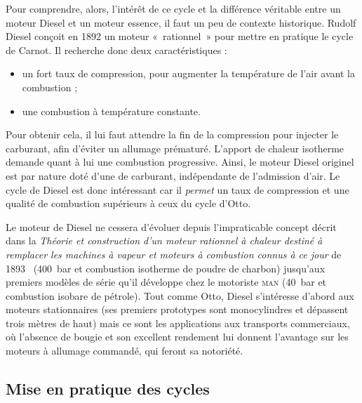 		Pour comprendre, alors, l’intérêt de ce cycle et la différence véritable entre un moteur Diesel et un moteur essence, il faut un peu de contexte historique. Rudolf Diesel conçoit en 1892 un moteur «~rationnel~» pour mettre en pratique le cycle de Carnot. Il recherche donc deux caractéristiques :
		\begin{itemize}
			\item un fort taux de compression, pour augmenter la température de l’air avant la combustion ;
			\item une combustion à température constante.
		\end{itemize}
		Pour obtenir cela, il lui faut attendre la fin de la compression pour injecter le carburant, afin d’éviter un allumage prématuré. L’apport de chaleur isotherme demande quant à lui une combustion progressive. Ainsi, le moteur Diesel originel est par nature doté d’une  de carburant, indépendante de l’admission d’air. Le cycle de Diesel est donc intéressant car il \emph{permet} un taux de compression et une qualité de combustion supérieurs à ceux du cycle d’Otto.
		
		Le moteur de Diesel ne cessera d’évoluer depuis l’impraticable concept décrit dans la \textit{Théorie et construction d’un moteur rationnel à chaleur destiné à remplacer les machines à vapeur et moteurs à combustion connus à ce jour} de 1893~\cite{diesel1893,diesel1893en} (\SI{400}{\bar} et combustion isotherme de poudre de charbon) jusqu’aux premiers modèles de série qu’il développe chez le motoriste \textsc{man} (\SI{40}{\bar} et combustion isobare de pétrole). Tout comme Otto, Diesel s’intéresse d’abord aux moteurs stationnaires (ses premiers prototypes sont monocylindres et dépassent trois mètres de haut) mais ce sont les applications aux transports commerciaux, où l’absence de bougie et son excellent rendement lui donnent l’avantage sur les moteurs à allumage commandé, qui feront sa notoriété.

	\subsection{Mise en pratique des cycles}
	\label{ch_cycles_pistons_reels}

